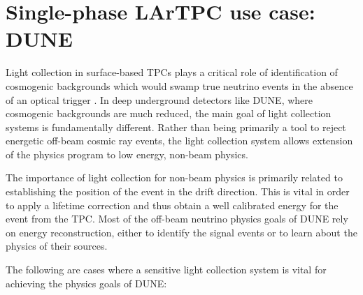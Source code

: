 \section{Single-phase LArTPC use case: DUNE}

Light collection in surface-based TPCs plays a critical role of identification of cosmogenic backgrounds which would swamp true neutrino events in the absence of an optical trigger \cite{MicroBooNECosmic}. In deep underground detectors like DUNE, where cosmogenic backgrounds are much reduced, the main goal of light collection systems is fundamentally different. Rather than being primarily a tool to reject energetic off-beam cosmic ray events, the light collection system allows extension of the physics program to low energy, non-beam physics.

The importance of light collection for non-beam physics is primarily related to establishing the position of the event in the drift direction.  This is vital in order to apply a lifetime correction and thus obtain a well calibrated energy for the event from the TPC.  Most of the off-beam neutrino physics goals of DUNE rely on energy reconstruction, either to identify the signal events or to learn about the physics of their sources.

The following are cases where a sensitive light collection system is vital for achieving the physics goals of DUNE:

